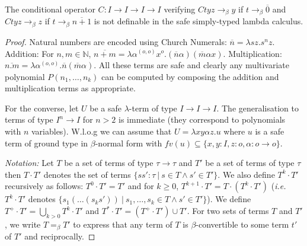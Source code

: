 \documentclass{llncs}
\newcommand{\encode}[1]{\overline{#1}} \newcommand\dps{\displaystyle}
\newcommand\union{\cup}
\newcommand\Union{\bigcup}
\newcommand\nat{\mathbb{N}}
\begin{document}
\begin{corollary}
The conditional operator $C:I\rightarrow I\rightarrow I \rightarrow I$ verifying  $C t y z \rightarrow_\beta y$  if $t \rightarrow_\beta \encode{0}$ and $C t y z \rightarrow_\beta z$ if $t \rightarrow_\beta \encode{n+1}$ is not definable in the safe simply-typed lambda calculus.
\end{corollary}
\begin{proof}
  Natural numbers are encoded using Church Numerals: $\encode{n} =
  \lambda s z. s^n z$.  Addition: For $n,m \in \nat$, $\encode{n+m} =
  \lambda \alpha^{(o,o)} x^o . (\encode{n} \alpha) (\encode{m} \alpha
  x)$. Multiplication: $\encode{n . m} = \lambda \alpha^{(o,o)}
  . \encode{n} (\encode{m} \alpha)$.  All these terms are safe and
  clearly any multivariate polynomial $P(n_1, \ldots, n_k)$ can be
  computed by composing the addition and multiplication terms as
  appropriate.

For the converse, let $U$ be a safe $\lambda$-term of type
$I\rightarrow I\rightarrow I$.  The generalisation to terms of type
$I^n \rightarrow I$ for $n>2$ is immediate (they correspond to
polynomials with $n$ variables). W.l.o.g we can
assume that $U = \lambda x y \alpha z. u$ where $u$ is a safe term of
ground type in $\beta$-normal form with $fv(u) \subseteq \{ x, y : I,
z :o, \alpha : o\rightarrow o \}$.

\emph{Notation:} Let $T$ be a set of terms of type $\tau \rightarrow \tau$ and $T'$ be a set of terms of type $\tau$ then $T \cdot T'$ denotes the set of terms $\{ s s' : \tau \ | \ s \in T \wedge s' \in T' \}$. We also define
$T^k \cdot T'$ recursively as follows:  $T^0 \cdot T' = T'$ and
for $k\geq 0$, $T^{k+1} \cdot T' = T \cdot (T^k \cdot T')$ ({\it i.e.}~$T^k \cdot T'$ denotes $\{ s_1( \ldots (s_k s'))  \ | \ s_1, \ldots, s_k \in T \wedge s' \in T' \}$). We define $T^+\cdot T' = \Union_{k > 0} T^k \cdot T'$ and
$T^*\cdot T' = (T^+\cdot T') \union T'$.
For two sets of terms $T$ and $T'$, we write $T =_\beta T'$ to express that any term of $T$ is $\beta$-convertible to some term $t'$ of $T'$ and reciprocally.


\end{proof}
\end{document}
